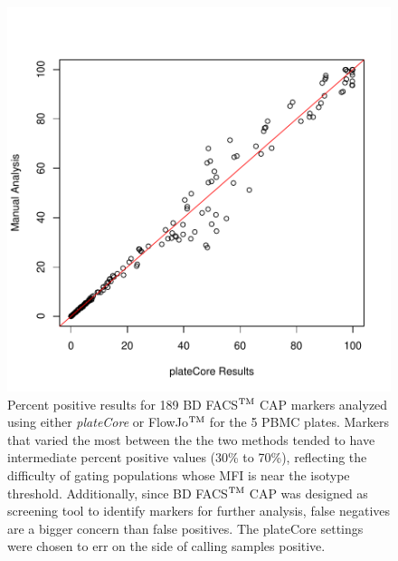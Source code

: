 \documentclass[12pt]{article}
\newcommand{\Rpackage}[1]{{\textit{#1}}}
\def\tm{$^{\rm \text{TM }}$}
\begin{document}
\clearpage
\begin{figure}
\centering
\includegraphics{outline-pcVSman}
\caption{Percent positive results for 189 BD FACS\tm CAP markers analyzed using either \Rpackage{plateCore}
or FlowJo\tm for the 5 PBMC plates. Markers that varied the most between the the two methods tended to have
intermediate percent positive values (30\% to 70\%), reflecting the difficulty of gating populations whose MFI is 
near the isotype threshold. Additionally, since BD FACS\tm CAP was designed as screening tool to 
identify markers for further analysis, false negatives are a bigger concern than false positives. The plateCore
settings were chosen to err on the side of calling samples positive.
}
\label{fig:pcVSman}
\end{figure}
\end{document}
